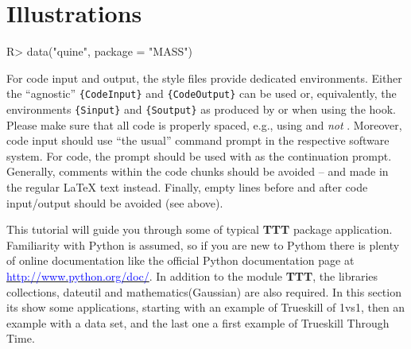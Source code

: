 \documentclass[article]{jss}
\newcommand{\fct}[1]{\code{#1()}}
\begin{document}

\section{Illustrations} \label{sec:illustrations}

%
\begin{CodeChunk}
\begin{CodeInput}
R> data("quine", package = "MASS")
\end{CodeInput}
\end{CodeChunk}

\begin{leftbar}
For code input and output, the style files provide dedicated environments.
Either the ``agnostic'' \verb|{CodeInput}| and \verb|{CodeOutput}| can be used
or, equivalently, the environments \verb|{Sinput}| and \verb|{Soutput}| as
produced by \fct{Sweave} or  when using the 
hook. Please make sure that all code is properly spaced, e.g., using
 and \emph{not} . Moreover, code input should
use ``the usual'' command prompt in the respective software system. For
 code, the prompt  should be used with  as
the continuation prompt. Generally, comments within the code chunks should be
avoided -- and made in the regular {\LaTeX} text instead. Finally, empty lines
before and after code input/output should be avoided (see above).
\end{leftbar}

This tutorial will guide you through some of typical \textbf{TTT} package application.
Familiarity with Python is assumed, so if you are new to Pythom there is plenty of online documentation like the official Python documentation
page at \href{http://www.python.org/doc/}{\textcolor{blue}{http://www.python.org/doc/}}.
In addition to the module \textbf{TTT}, the libraries collections, dateutil and mathematics(Gaussian) are also required.
In this section its show some applications, starting with an example of Trueskill of 1vs1, then an example with a data set, and the last one a first example of Trueskill Through Time.
\end{document}

